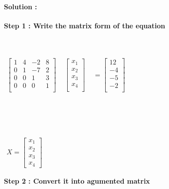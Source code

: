\documentclass[15pt]{article}
\begin{document}
\textbf{Solution :}\\
\\
\hspace{1.5cm}
\textbf{Step 1 : Write the matrix form of the equation }\\
\\
\\
\centerline{
$\begin{matrix}
\begin{bmatrix}
1 &  4 & -2 & 8\\
0 & 1 &  -7 & 2\\
0 & 0 & 1  & 3\\
0 & 0 & 0 & 1\\
\end{bmatrix}
\end{matrix}$
$\begin{matrix}
\begin{bmatrix}
x_1\\
x_2\\
x_3\\
x_4\\
\end{bmatrix}
\end{matrix}$
$\begin{matrix}
=
\begin{bmatrix}
12\\
-4\\
-5\\
-2\\
\end{bmatrix}
\end{matrix}$}\\ \\ \\

\centerline{
$\begin{matrix}
X=
\begin{bmatrix}
x_1\\
x_2\\
x_3\\
x_4
\end{bmatrix}
\end{matrix}$
}

\textbf{Step 2 : Convert it into agumented matrix }\\
\\
\end{document}
